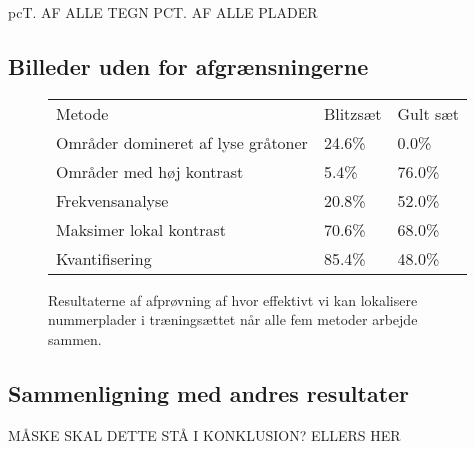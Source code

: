 pcT. AF ALLE TEGN
PCT. AF ALLE PLADER


\subsection{Billeder uden for afgrænsningerne}

\begin{figure}[htp]
\centering
\begin{tabular}{|l|l|l|}
\hline
\rowcolor[gray]{0.9} \multicolumn{3}{|>{\columncolor[gray]{0.9}}c|}{\textbf{..}} \\ \hline
Metode & Blitzsæt & Gult sæt\\ \hline
Områder domineret af lyse gråtoner &  24.6\% & 0.0\%\\ \hline
Områder med høj kontrast & 5.4\% & 76.0\%\\ \hline
Frekvensanalyse &  20.8\% & 52.0\%\\ \hline
Maksimer lokal kontrast &  70.6\% & 68.0\%\\ \hline
Kvantifisering &  85.4\% & 48.0\%\\
\hline
\end{tabular}
\caption{Resultaterne af afprøvning af hvor effektivt vi kan lokalisere nummerplader i træningsættet når alle fem metoder arbejde sammen.}
\label{fig:test:lokalisering_blitz_gul}
\end{figure}
\subsection{Sammenligning med andres resultater}

MÅSKE SKAL DETTE STÅ I KONKLUSION? ELLERS HER

